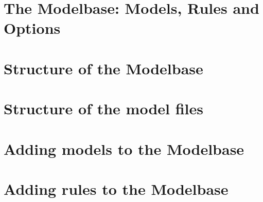 \documentclass[11pt,a4paper]{article}
\begin{document}
\section{The Modelbase: Models, Rules and Options}\label{sec:usingMMB}
\vspace{0.5cm}


\section{Structure of the Modelbase}
\label{sec:MMBstructure}
\vspace{0.5cm}


\section{Structure of the model files}\label{sec:ModelfileStructure}
\vspace{0.5cm}


\section{Adding models to the Modelbase}\label{sec:HowToAddModels}
\vspace{0.5cm}



\section{Adding rules to the Modelbase}\label{sec:HowToAddRules}
\vspace{0.5cm}






\end{document}
